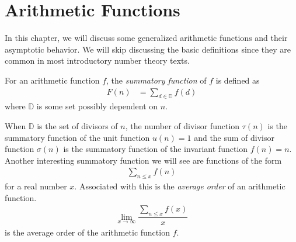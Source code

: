 \documentclass[elemannt.tex]{subfile}
\begin{document}
	\chapter{Arithmetic Functions}
	In this chapter, we will discuss some generalized arithmetic functions and their asymptotic behavior. We will skip discussing the basic definitions since they are common in most introductory number theory texts.
		\begin{definition}
			For an arithmetic function $f$, the \textit{summatory function} of $f$ is defined as
				\begin{align*}
					F(n)
						& = \sum_{d\in \mathbb{D}}f(d)
				\end{align*}
			where $\mathbb{D}$ is some set possibly dependent on $n$.
		\end{definition}
	When $\mathbb{D}$ is the set of divisors of $n$, the number of divisor function $\tau(n)$ is the summatory function of the unit function $u(n)=1$ and the sum of divisor function $\sigma(n)$ is the summatory function of the invariant function $f(n)=n$. Another interesting summatory function we will see are functions of the form
		\begin{align*}
			\sum_{n\leq x}f(n)
		\end{align*}
	for a real number $x$. Associated with this is the \textit{average order} of an arithmetic function.
		\begin{align*}
			\lim\limits_{x\to\infty}\dfrac{\sum_{n\leq x}f(x)}{x}
		\end{align*}
	is the average order of the arithmetic function $f$.
	
\end{document}
